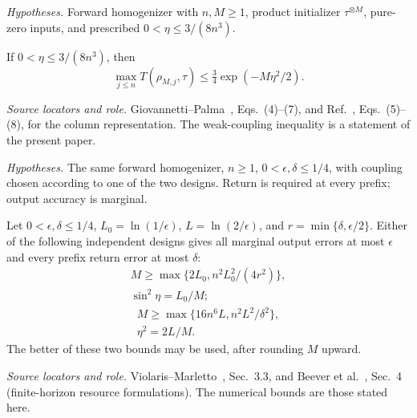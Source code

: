 \documentclass[11pt]{article}
\begin{document}
\par\medskip
\noindent\begin{minipage}{\linewidth}
\emph{Hypotheses.} Forward homogenizer with $n,M\ge1$, product initializer $\tau^{\otimes M}$, pure-zero inputs, and prescribed $0<\eta\le3/(8n^3)$.

\begin{lemma}
If $0<\eta\le3/(8n^3)$, then
\begin{equation}
 \max_{j\le n}T(\rho_{M,j},\tau)
 \le\tfrac34\exp(-M\eta^2/2).
\end{equation}
\end{lemma}

\noindent\emph{Source locators and role.} Giovannetti--Palma~\cite{gp}, Eqs.~(4)--(7), and Ref.~\cite{cascade}, Eqs.~(5)--(8), for the column representation. The weak-coupling inequality is a statement of the present paper.
\end{minipage}
\par

\par\medskip
\noindent\begin{minipage}{\linewidth}
\emph{Hypotheses.} The same forward homogenizer, $n\ge1$, $0<\epsilon,\delta\le1/4$, with coupling chosen according to one of the two designs. Return is required at every prefix; output accuracy is marginal.

\begin{theorem}
Let $0<\epsilon,\delta\le1/4$, $L_0=\ln(1/\epsilon)$, $L=\ln(2/\epsilon)$, and $r=\min\{\delta,\epsilon/2\}$. Either of the following independent designs gives all marginal output errors at most $\epsilon$ and every prefix return error at most $\delta$:
\begin{equation}
 \begin{gathered}
 M\ge\max\{2L_0,n^2L_0^2/(4r^2)\},\\
 \sin^2\eta=L_0/M;
 \end{gathered}
\end{equation}
\begin{equation}
 \begin{gathered}
 M\ge\max\{16n^6L,n^2L^2/\delta^2\},\\
 \eta^2=2L/M.
 \end{gathered}
\end{equation}
The better of these two bounds may be used, after rounding $M$ upward.
\end{theorem}

\noindent\emph{Source locators and role.} Violaris--Marletto~\cite{vm}, Sec.~3.3, and Beever et al.~\cite{beever}, Sec.~4 (finite-horizon resource formulations). The numerical bounds are those stated here.
\end{minipage}
\par
\end{document}
